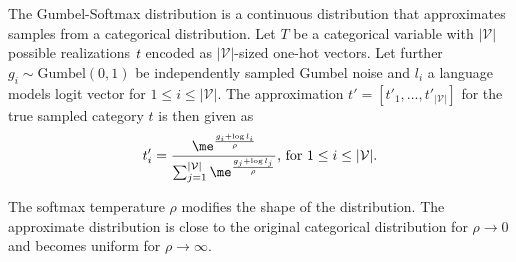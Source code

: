     \begin{definition}
        The Gumbel-Softmax distribution is a continuous distribution that approximates samples from a categorical distribution.
        Let $T$ be a categorical variable with $|\mathcal{V}|$ possible realizations $\emph{t}$ encoded as $|\mathcal{V}|$-sized one-hot vectors.
        Let further $g_i \sim \mathrm{Gumbel}(0,1)$ be independently sampled Gumbel noise and $l_i$ a language models logit vector for $1 \leq i \leq |\mathcal{V}|$.
        The approximation $t' = [t'_1, \dots, t'_{|\mathcal{V}|}]$ for the true sampled category $t$ is then given as
        \begin{equation}
            t'_i = \frac{\me^{\frac{g_i + \log l_i}{\rho}}}{\sum_{j=1}^{|\mathcal{V}|} \me^{\frac{g_j + \log l_j}{\rho}}} \text{, for $1 \leq i \leq |\mathcal{V}|$.}  
        \end{equation}
        
        The softmax temperature $\rho$ modifies the shape of the distribution.
        The approximate distribution is close to the original categorical distribution for $\rho \to 0$ and becomes uniform for $\rho \to \infty$.
    \end{definition}

